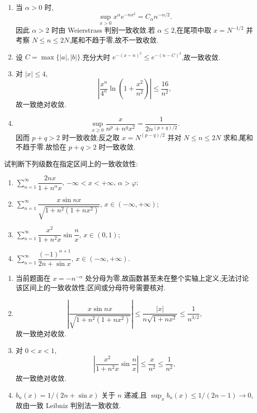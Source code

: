 \begin{solution}
    \begin{enumerate}
        \item 当 $\alpha>0$ 时,
              \[
                  \sup_{x>0}x^\alpha e^{-nx^2}=C_\alpha n^{-\alpha/2}.
              \]
              因此 $\alpha>2$ 时由 Weierstrass 判别一致收敛.若 $\alpha\leq2$,在尾项中取 $x=N^{-1/2}$ 并考察 $N\leq n\leq2N$,尾和不趋于零,故不一致收敛.
        \item 设 $C=\max\{|a|,|b|\}$.充分大时
              $e^{-(x-n)^2}\leq e^{-(n-C)^2}$,故一致收敛.
        \item 对 $|x|\leq4$,
              \[
                  \left|\dfrac{x^n}{4^n}\ln\left(1+\dfrac{x^2}{n^2}\right)\right|
                  \leq\dfrac{16}{n^2},
              \]
              故一致绝对收敛.
        \item
              \[
                  \sup_{x\geq0}\dfrac{x}{n^p+n^qx^2}=\dfrac{1}{2n^{(p+q)/2}}.
              \]
              因而 $p+q>2$ 时一致收敛;反之取 $x=N^{(p-q)/2}$ 并对
              $N\leq n\leq2N$ 求和,尾和不趋于零.故恰在 $p+q>2$ 时一致收敛.
    \end{enumerate}
\end{solution}

\begin{example}
    试判断下列级数在指定区间上的一致收敛性:
    \begin{enumerate}
        \item $\displaystyle\sum\limits_{n=1}^{\infty}\dfrac{2nx}{1+n^\alpha x}$, $-\infty<x<+\infty$, $\alpha>\varphi$;
        \item $\displaystyle\sum\limits_{n=1}^{\infty}\dfrac{x\sin nx}{\sqrt{1+n^2(1+nx^2)}}$, $x\in(-\infty,+\infty)$;
        \item $\displaystyle\sum\limits_{n=1}^{\infty}\dfrac{x^2}{1+n^2x}\sin\dfrac{n}{x}$, $x\in(0,1)$;
        \item $\displaystyle\sum\limits_{n=1}^{\infty}\dfrac{(-1)^{n+1}}{2n+\sin x}$, $x\in(-\infty,+\infty)$.
    \end{enumerate}
\end{example}
\exampleblank

\begin{solution}
    \begin{enumerate}
        \item 当前题面在 $x=-n^{-\alpha}$ 处分母为零,故函数甚至未在整个实轴上定义,无法讨论该区间上的一致收敛性;区间或分母符号需要核对.
        \item
              \[
                  \left|\dfrac{x\sin nx}{\sqrt{1+n^2(1+nx^2)}}\right|
                  \leq\dfrac{|x|}{n\sqrt{1+nx^2}}\leq\dfrac{1}{n^{3/2}},
              \]
              故一致绝对收敛.
        \item 对 $0<x<1$,
              \[
                  \left|\dfrac{x^2}{1+n^2x}\sin\dfrac{n}{x}\right|\leq\dfrac{x}{n^2}\leq\dfrac{1}{n^2},
              \]
              故一致绝对收敛.
        \item $b_n(x)=1/(2n+\sin x)$ 关于 $n$ 递减,且
              $\sup_xb_n(x)\leq1/(2n-1)\to0$,故由一致 Leibniz 判别法一致收敛.
    \end{enumerate}
\end{solution}

